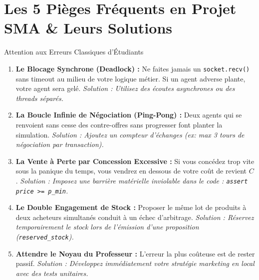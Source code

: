 \documentclass[11pt,a4paper]{article}
\begin{document}
\section{Les 5 Pièges Fréquents en Projet SMA \& Leurs Solutions}

\begin{warningbox}{Attention aux Erreurs Classiques d'Étudiants}
\begin{enumerate}[leftmargin=*, itemsep=2pt]
    \item \textbf{Le Blocage Synchrone (Deadlock) :} Ne faites jamais un \texttt{socket.recv()} sans timeout au milieu de votre logique métier. Si un agent adverse plante, votre agent sera gelé. \textit{Solution : Utilisez des écoutes asynchrones ou des threads séparés.}
    \item \textbf{La Boucle Infinie de Négociation (Ping-Pong) :} Deux agents qui se renvoient sans cesse des contre-offres sans progresser font planter la simulation. \textit{Solution : Ajoutez un compteur d'échanges (ex: max 3 tours de négociation par transaction).}
    \item \textbf{La Vente à Perte par Concession Excessive :} Si vous concédez trop vite sous la panique du temps, vous vendrez en dessous de votre coût de revient $C$. \textit{Solution : Imposez une barrière matérielle inviolable dans le code : \texttt{assert price >= p\_min}.}
    \item \textbf{Le Double Engagement de Stock :} Proposer le même lot de produits à deux acheteurs simultanés conduit à un échec d'arbitrage. \textit{Solution : Réservez temporairement le stock lors de l'émission d'une proposition (\texttt{reserved\_stock}).}
    \item \textbf{Attendre le Noyau du Professeur :} L'erreur la plus coûteuse est de rester passif. \textit{Solution : Développez immédiatement votre stratégie marketing en local avec des tests unitaires.}
\end{enumerate}
\end{warningbox}
\end{document}
